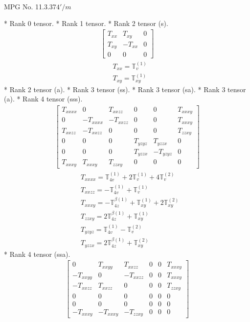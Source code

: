 \documentclass[fleqn,8pt,landscape]{jsarticle}
\begin{document}
\setcounter{MaxMatrixCols}{32}

\renewcommand{\tablename}{Table~}
\renewcommand{\figurename}{Figure~}
\begin{center}
\LARGE
MPG No. 11.3.37\quad$4'/m$
\end{center}
* Rank 0 tensor.
* Rank 1 tensor.
* Rank 2 tensor (s).
\begin{align*}
\begin{bmatrix} T_{xx} & T_{xy} & 0 \\ T_{xy} & - T_{xx} & 0 \\ 0 & 0 & 0 \end{bmatrix}
\end{align*}
\begin{align*}
& T_{xx} = \mathbb{T}_{v}^{(1)} \\
& T_{xy} = \mathbb{T}_{xy}^{(1)}
\end{align*}
* Rank 2 tensor (a).
* Rank 3 tensor (ss).
* Rank 3 tensor (sa).
* Rank 3 tensor (a).
* Rank 4 tensor (sss).
\begin{align*}
\begin{bmatrix} T_{xxxx} & 0 & T_{xxzz} & 0 & 0 & T_{xxxy} \\ 0 & - T_{xxxx} & - T_{xxzz} & 0 & 0 & T_{xxxy} \\ T_{xxzz} & - T_{xxzz} & 0 & 0 & 0 & T_{zzxy} \\ 0 & 0 & 0 & T_{yzyz} & T_{yzzx} & 0 \\ 0 & 0 & 0 & T_{yzzx} & - T_{yzyz} & 0 \\ T_{xxxy} & T_{xxxy} & T_{zzxy} & 0 & 0 & 0 \end{bmatrix}
\end{align*}
\begin{align*}
& T_{xxxx} = \mathbb{T}_{4v}^{(1)} + 2 \mathbb{T}_{v}^{(1)} + 4 \mathbb{T}_{v}^{(2)} \\
& T_{xxzz} = - \mathbb{T}_{4v}^{(1)} + \mathbb{T}_{v}^{(1)} \\
& T_{xxxy} = - \mathbb{T}_{4z}^{\beta(1)} + \mathbb{T}_{xy}^{(1)} + 2 \mathbb{T}_{xy}^{(2)} \\
& T_{zzxy} = 2 \mathbb{T}_{4z}^{\beta(1)} + \mathbb{T}_{xy}^{(1)} \\
& T_{yzyz} = \mathbb{T}_{4v}^{(1)} - \mathbb{T}_{v}^{(2)} \\
& T_{yzzx} = 2 \mathbb{T}_{4z}^{\beta(1)} + \mathbb{T}_{xy}^{(2)}
\end{align*}
* Rank 4 tensor (ssa).
\begin{align*}
\begin{bmatrix} 0 & T_{xxyy} & T_{xxzz} & 0 & 0 & T_{xxxy} \\ - T_{xxyy} & 0 & - T_{xxzz} & 0 & 0 & T_{xxxy} \\ - T_{xxzz} & T_{xxzz} & 0 & 0 & 0 & T_{zzxy} \\ 0 & 0 & 0 & 0 & 0 & 0 \\ 0 & 0 & 0 & 0 & 0 & 0 \\ - T_{xxxy} & - T_{xxxy} & - T_{zzxy} & 0 & 0 & 0 \end{bmatrix}
\end{align*}
\end{document}
